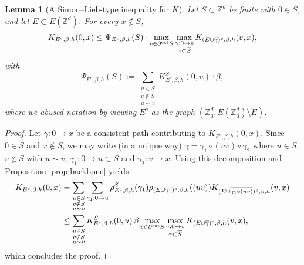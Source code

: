\documentclass[11pt,a4paper]{article}
\numberwithin{equation}{section}
\theoremstyle{plain}
\newtheorem{Lem}[Thm]{Lemma}
\theoremstyle{definition}
\newcommand\fg{\mathfrak{g}}
\begin{document}
\begin{Lem}[A Simon--Lieb-type inequality for $K$]\label{lem: SL for K} Let $S\subset \mathbb Z^d$ be finite with $0\in S$, and let $E\subset E(\mathbb Z^d)$. For every $x\notin S$,
\begin{equation}
	K_{E^c,\beta,h}(0,x)\leq \Psi_{E^c,\beta,h}(S)\cdot \max_{v\in \partial^{\textup{ext}}S}\max_{\substack{\gamma:0\rightarrow v\\\gamma\subset\overline{S}}}K_{(E\cup\overline{\gamma})^c,\beta,h}(v,x),
\end{equation}
with \begin{equation}
	\Psi_{E^c,\beta,h}(S):=\sum_{\substack{u\in S\\v\notin S\\u\sim v}}K_{E^c,\beta,h}^S(0,u)\cdot \beta,
\end{equation}
where we abused notation by viewing $E^c$ as the graph $(\mathbb Z^d_\fg,E(\mathbb Z^d_\fg)\setminus E)$. 
\end{Lem}
\begin{proof} Let $\gamma:0\rightarrow x$ be a consistent path contributing to $K_{E^c,\beta,h}(0,x)$. Since $0\in S$ and $x\notin S$, we may write (in a unique way) $\gamma=\gamma_1\circ(uv)\circ\gamma_2$ where $u\in S$, $v\notin S$ with $u\sim v$, $\gamma_1:0\rightarrow u\subset S$ and $\gamma_2:v\rightarrow x$. Using this decomposition and Proposition \ref{prop:backbone} yields
\begin{align}
\begin{aligned}
	K_{E^c,\beta,h}(0,x)&=\sum_{\substack{u\in S\\v\notin S\\ u\sim v}}\sum_{\gamma_1:0\rightarrow u}\rho_{E^c,\beta,h}^S(\gamma_1)\rho_{(E\cup \overline{\gamma_1})^c,\beta,h}((uv))K_{(E\cup \overline{\gamma_1\circ (uv)})^c,\beta,h}(v,x)
	\\&\leq \sum_{\substack{u\in S\\v\notin S\\u\sim v}}K_{E^c,\beta,h}^S(0,u)\, \beta  \max_{v\in \partial^{\textup{ext}}S}\max_{\substack{\gamma:0\rightarrow v\\\gamma\subset \overline{S}}}K_{(E\cup\overline{\gamma})^c,\beta,h}(v,x),
	\end{aligned}
\end{align}
		which concludes the proof.
\end{proof}
\end{document}
